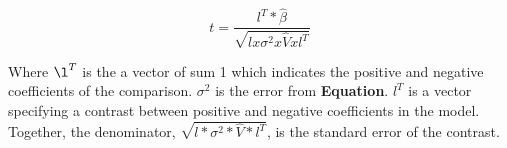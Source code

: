 \documentclass[11pt]{elife}\usepackage[]{graphicx}\usepackage[]{color}
\begin{document}
\begin{equation}
	t = \frac{l^T * \hat{\beta}}{\sqrt{l x \sigma^2 x \hat{V} x l^T}}
\end{equation}

Where $\l^T$ is the a vector of sum 1 which indicates the positive and negative
coefficients of the comparison. $\sigma^2$ is the error from \textbf{Equation}. $l^T$ is a vector specifying a contrast between positive and 
negative coefficients in the model. Together, the denominator,
$\sqrt{l * \sigma^2 * \hat{V} * l^T}$, is the 
standard error of the contrast.\\


\end{document}
